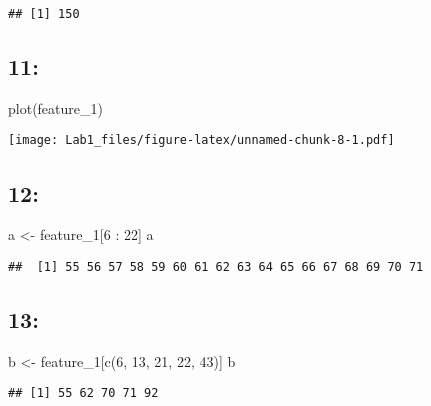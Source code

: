 \documentclass[
]{article}
\newenvironment{Shaded}{\begin{snugshade}}{\end{snugshade}}
\newcommand{\DecValTok}[1]{\textcolor[rgb]{0.00,0.00,0.81}{#1}}
\newcommand{\FunctionTok}[1]{\textcolor[rgb]{0.00,0.00,0.00}{#1}}
\newcommand{\NormalTok}[1]{#1}
\newcommand{\OtherTok}[1]{\textcolor[rgb]{0.56,0.35,0.01}{#1}}
\newcommand{\SpecialCharTok}[1]{\textcolor[rgb]{0.00,0.00,0.00}{#1}}
\begin{document}
\begin{verbatim}
## [1] 150
\end{verbatim}

\hypertarget{section-10}{%
\subsection{11:}\label{section-10}}

\begin{Shaded}
\begin{Highlighting}[]
\FunctionTok{plot}\NormalTok{(feature\_1)}
\end{Highlighting}
\end{Shaded}

\texttt{[image: Lab1\_files/figure-latex/unnamed-chunk-8-1.pdf]}

\hypertarget{section-11}{%
\subsection{12:}\label{section-11}}

\begin{Shaded}
\begin{Highlighting}[]
\NormalTok{a }\OtherTok{\textless{}{-}}\NormalTok{ feature\_1[}\DecValTok{6} \SpecialCharTok{:} \DecValTok{22}\NormalTok{]}
\NormalTok{a}
\end{Highlighting}
\end{Shaded}

\begin{verbatim}
##  [1] 55 56 57 58 59 60 61 62 63 64 65 66 67 68 69 70 71
\end{verbatim}

\hypertarget{section-12}{%
\subsection{13:}\label{section-12}}

\begin{Shaded}
\begin{Highlighting}[]
\NormalTok{b }\OtherTok{\textless{}{-}}\NormalTok{ feature\_1[}\FunctionTok{c}\NormalTok{(}\DecValTok{6}\NormalTok{, }\DecValTok{13}\NormalTok{, }\DecValTok{21}\NormalTok{, }\DecValTok{22}\NormalTok{, }\DecValTok{43}\NormalTok{)]}
\NormalTok{b}
\end{Highlighting}
\end{Shaded}

\begin{verbatim}
## [1] 55 62 70 71 92
\end{verbatim}
\end{document}
